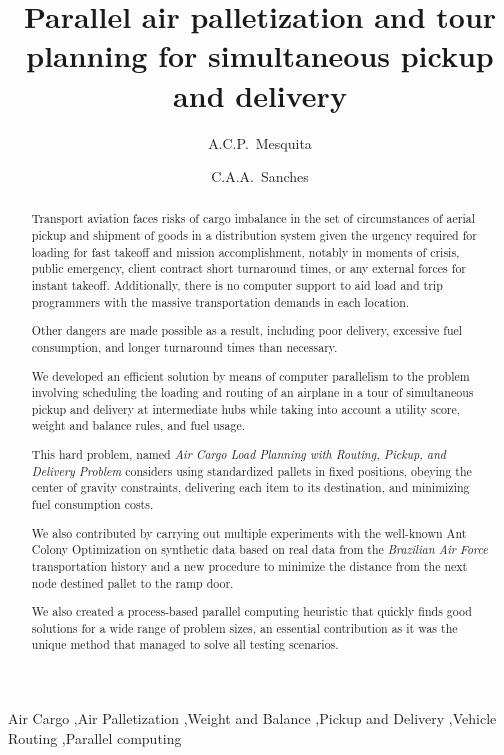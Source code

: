 \documentclass[preprint,authoryear]{elsarticle}
\begin{document}
\begin{frontmatter}

\title{Parallel air palletization and tour planning for simultaneous pickup and delivery}

\author{A.C.P.~Mesquita}

\author{C.A.A.~Sanches}

\address {Instituto Tecnol\'{o}gico de Aeron\'{a}utica - DCTA/ITA/IEC\\
Pra\c{c}a Mal. Eduardo Gomes, 50\\
S\~{a}o Jos\'{e} dos Campos - SP - 12.228-900 - Brazil}


\begin{abstract}

Transport aviation faces risks of cargo imbalance in the set of circumstances of aerial pickup and shipment of goods in a distribution system given the urgency required for loading for fast takeoff and mission accomplishment, notably in moments of crisis, public emergency, client contract short turnaround times, or any external forces for instant takeoff. Additionally, there is no computer support to aid load and trip programmers with the massive transportation demands in each location.

Other dangers are made possible as a result, including poor delivery, excessive fuel consumption, and longer turnaround times than necessary.

We developed an efficient solution by means of computer parallelism to the problem involving scheduling the loading and routing of an airplane in a tour of simultaneous pickup and delivery at intermediate hubs while taking into account a utility score, weight and balance rules, and fuel usage.

This hard problem, named {\it Air Cargo Load Planning with Routing, Pickup, and Delivery Problem} considers using standardized pallets in fixed positions, obeying the center of gravity constraints, delivering each item to its destination, and minimizing fuel consumption costs.

We also contributed by carrying out multiple experiments with the well-known Ant Colony Optimization on synthetic data based on real data from the {\it Brazilian Air Force}\/ transportation history and a new procedure to minimize the distance from the next node destined pallet to the ramp door.

We also created a process-based parallel computing heuristic that quickly finds good solutions for a wide range of problem sizes, an essential contribution as { \color{red} it was the unique method that managed to solve all testing scenarios.}

\end{abstract}

\begin{keyword}
Air Cargo \sep Air Palletization \sep Weight and Balance \sep Pickup and Delivery \sep Vehicle Routing \sep Parallel computing
\end{keyword}

\end{frontmatter}
\end{document}
